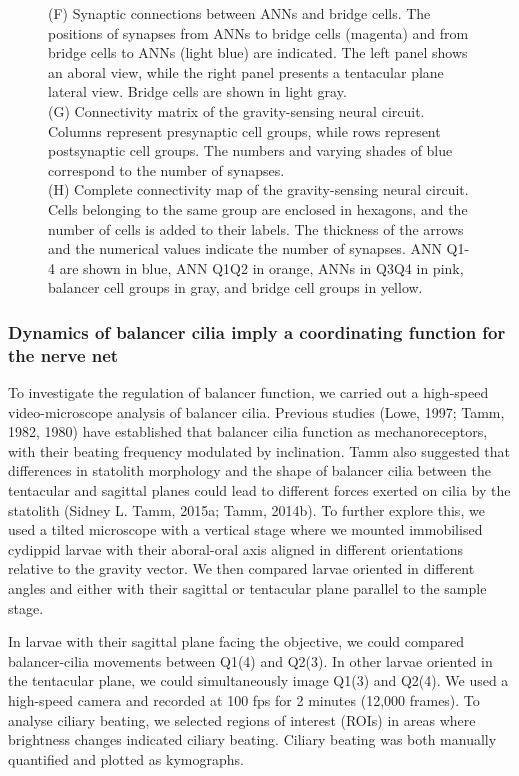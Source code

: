 \documentclass[
  11pt,
]{article}
\begin{document}
\begin{figure}[H]
{(F) Synaptic connections between ANNs and bridge cells. The positions of
synapses from ANNs to bridge cells (magenta) and from bridge cells to
ANNs (light blue) are indicated. The left panel shows an aboral view,
while the right panel presents a tentacular plane lateral view. Bridge
cells are shown in light gray.\\
(G) Connectivity matrix of the gravity-sensing neural circuit. Columns
represent presynaptic cell groups, while rows represent postsynaptic
cell groups. The numbers and varying shades of blue correspond to the
number of synapses.\\
(H) Complete connectivity map of the gravity-sensing neural circuit.
Cells belonging to the same group are enclosed in hexagons, and the
number of cells is added to their labels. The thickness of the arrows
and the numerical values indicate the number of synapses. ANN Q1-4 are
shown in blue, ANN Q1Q2 in orange, ANNs in Q3Q4 in pink, balancer cell
groups in gray, and bridge cell groups in yellow.}

\end{figure}%

\subsubsection{Dynamics of balancer cilia imply a coordinating function
for the nerve
net}\label{dynamics-of-balancer-cilia-imply-a-coordinating-function-for-the-nerve-net}

To investigate the regulation of balancer function, we carried out a
high-speed video-microscope analysis of balancer cilia. Previous studies
(Lowe, 1997; Tamm, 1982, 1980) have established that balancer cilia
function as mechanoreceptors, with their beating frequency modulated by
inclination. Tamm also suggested that differences in statolith
morphology and the shape of balancer cilia between the tentacular and
sagittal planes could lead to different forces exerted on cilia by the
statolith (Sidney L. Tamm, 2015a; Tamm, 2014b). To further explore this,
we used a tilted microscope with a vertical stage where we mounted
immobilised cydippid larvae with their aboral-oral axis aligned in
different orientations relative to the gravity vector. We then compared
larvae oriented in different angles and either with their sagittal or
tentacular plane parallel to the sample stage.

In larvae with their sagittal plane facing the objective, we could
compared balancer-cilia movements between Q1(4) and Q2(3). In other
larvae oriented in the tentacular plane, we could simultaneously image
Q1(3) and Q2(4). We used a high-speed camera and recorded at 100 fps for
2 minutes (12,000 frames). To analyse ciliary beating, we selected
regions of interest (ROIs) in areas where brightness changes indicated
ciliary beating. Ciliary beating was both manually quantified and
plotted as kymographs.
\end{document}
